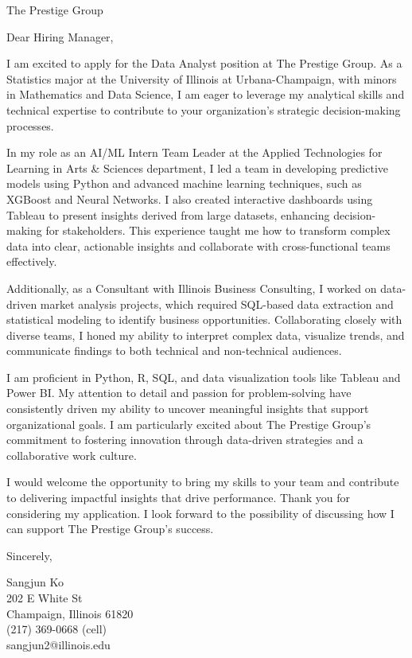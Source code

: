 \documentclass{letter}
\begin{document}
\begin{letter}{The Prestige Group
    }


\opening{Dear Hiring Manager,}
I am excited to apply for the Data Analyst position at The Prestige Group. As a Statistics major at the University of Illinois at Urbana-Champaign, with minors in Mathematics and Data Science, I am eager to leverage my analytical skills and technical expertise to contribute to your organization's strategic decision-making processes.

In my role as an AI/ML Intern Team Leader at the Applied Technologies for Learning in Arts \& Sciences department, I led a team in developing predictive models using Python and advanced machine learning techniques, such as XGBoost and Neural Networks. I also created interactive dashboards using Tableau to present insights derived from large datasets, enhancing decision-making for stakeholders. This experience taught me how to transform complex data into clear, actionable insights and collaborate with cross-functional teams effectively.

Additionally, as a Consultant with Illinois Business Consulting, I worked on data-driven market analysis projects, which required SQL-based data extraction and statistical modeling to identify business opportunities. Collaborating closely with diverse teams, I honed my ability to interpret complex data, visualize trends, and communicate findings to both technical and non-technical audiences.

I am proficient in Python, R, SQL, and data visualization tools like Tableau and Power BI. My attention to detail and passion for problem-solving have consistently driven my ability to uncover meaningful insights that support organizational goals. I am particularly excited about The Prestige Group’s commitment to fostering innovation through data-driven strategies and a collaborative work culture.

I would welcome the opportunity to bring my skills to your team and contribute to delivering impactful insights that drive performance. Thank you for considering my application. I look forward to the possibility of discussing how I can support The Prestige Group’s success.

\closing{Sincerely,
}

Sangjun Ko\\
202 E White St\\
Champaign, Illinois 61820\\
(217) 369-0668 (cell)\\sangjun2@illinois.edu
\end{letter}
\end{document}
